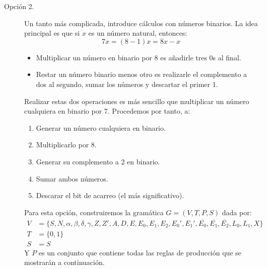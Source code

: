 \begin{ejercicio}
\begin{enumerate}
\begin{description}
                \item [Opción 2.] 
                    Un tanto más complicada, introduce cálculos con números binarios. La idea principal es que si $x$ es un número natural, entonces:
                    \begin{equation*}
                        7x = (8-1)x = 8x - x
                    \end{equation*}
                    \begin{itemize}
                        \item Multiplicar un número en binario por 8 es añadirle tres 0s al final.
                        \item Restar un número binario menos otro es realizarle el complemento a dos al segundo, sumar los números y descartar el primer 1.
                    \end{itemize}
                    Realizar estas dos operaciones es más sencillo que multiplicar un número cualquiera en binario por 7. Procedemos por tanto, a:
                    \begin{enumerate}
                        \item Generar un número cualquiera en binario.
                        \item Multiplicarlo por 8.
                        \item Generar su complemento a 2 en binario.
                        \item Sumar ambos números.
                        \item Descarar el bit de acarreo (el más significativo).
                    \end{enumerate}
                    Para esta opción, construiremos la gramática $G=(V,T,P,S)$ dada por:
                    \begin{align*}
                        V &= \{S, N, \alpha, \beta, \delta,\gamma, Z, Z', A, D, E, E_0, E_1, E_2, E_0', E_1', \overline{E_0}, \overline{E_1}, \overline{E_2}, L_0, L_1, X\} \\
                        T &= \{0,1\} \\
                        S &= S
                    \end{align*}
                    Y $P$ es un conjunto que contiene todas las reglas de producción que se mostrarán a continuación.


\end{description}
\end{enumerate}
\end{ejercicio}
